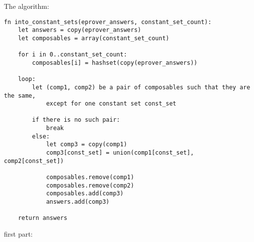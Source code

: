 \documentclass{article}
\begin{document}
The algorithm:
\begin{verbatim}
fn into_constant_sets(eprover_answers, constant_set_count):
    let answers = copy(eprover_answers)
    let composables = array(constant_set_count)

    for i in 0..constant_set_count:
        composables[i] = hashset(copy(eprover_answers))

    loop:
        let (comp1, comp2) be a pair of composables such that they are the same,
            except for one constant set const_set
            
        if there is no such pair:
            break
        else:
            let comp3 = copy(comp1)
            comp3[const_set] = union(comp1[const_set], comp2[const_set])

            composables.remove(comp1)
            composables.remove(comp2)
            composables.add(comp3)
            answers.add(comp3)
    
    return answers
\end{verbatim}

first part:
\begin{verbatim}

\end{verbatim}
\end{document}
